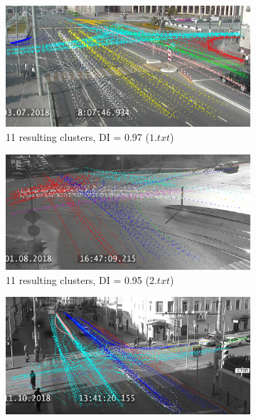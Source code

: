 \begin{figure}[!htb]
	\centering
	\begin{subfigure}[!htb]{0.23\textwidth}
		\centering{}
		\includegraphics[width=\textwidth]{images/cl-res/clust-res-1-rdp-n-diff-coeff-1.png}
		\caption{11 resulting clusters, DI = 0.97 ($1.txt$)}
		\label{fig:clust-res-1-rdp-n-diff-coeff-1}
	\end{subfigure}
	\hfill
	\begin{subfigure}[!htb]{0.23\textwidth}
		\centering{}
		\includegraphics[width=\textwidth]{images/cl-res/clust-res-1-rdp-n-diff-coeff-2.png}
		\caption{11 resulting clusters, DI = 0.95 ($2.txt$)}
		\label{fig:clust-res-1-rdp-n-diff-coeff-2}
	\end{subfigure}
	\hfill
	\begin{subfigure}[!htb]{0.23\textwidth}
		\centering{}
		\includegraphics[width=\textwidth]{images/cl-res/clust-res-1-rdp-n-diff-coeff-3.png}

\end{subfigure}
\end{figure}
